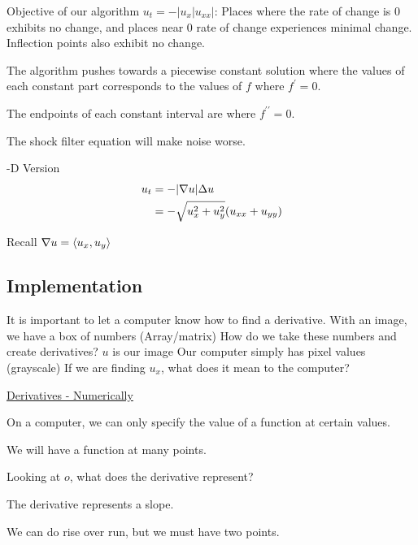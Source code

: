 Objective of our algorithm $u_t = -|u_x| u_{xx}|$: Places where the rate of change is $0$ exhibits no change, and places near $0$ rate of change experiences minimal change. Inflection points also exhibit no change.

The algorithm pushes towards a piecewise constant solution where the values of each constant part corresponds to the values of $f$ where $f^\prime = 0$.

The endpoints of each constant interval are where $f^{\prime\prime} = 0$.

\note The shock filter equation will make noise worse.

-D Version
%
\begin{align}
  u_t & = - | \nabla u | \Delta u\\
  & = - \sqrt{u^2_x + u^2_y} (u_{xx} + u_{yy})
\end{align}

Recall $\nabla u = \left< u_x, u_y \right>$


\subsection{Implementation}

It is important to let a computer know how to find a derivative.
With an image, we have a box of numbers (Array/matrix)
How do we take these numbers and create derivatives?
$u$ is our image
Our computer simply has pixel values (grayscale)
If we are finding $u_x$, what does it mean to the computer?

\underline{Derivatives - Numerically}

On a computer, we can only specify the value of a function at certain values.


We will have a function at many points.

Looking at $o$, what does the derivative represent?

The derivative represents a slope.

We can do rise over run, but we must have two points.

